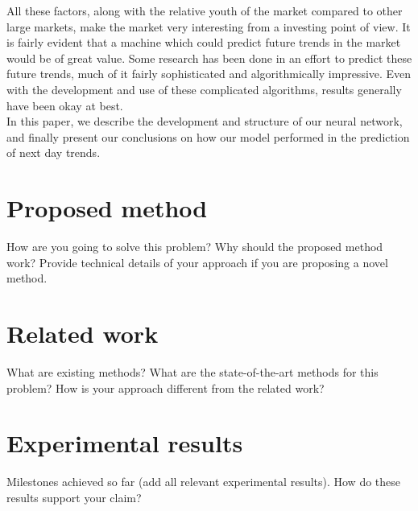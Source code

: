 \documentclass[twoside]{article}
\begin{document}
All these factors, along with the relative youth of the market compared to other large markets, make the market very interesting from a investing point of view. It is fairly evident that a machine which could predict future trends in the market would be of great value. Some research has been done in an effort to predict these future trends, much of it fairly sophisticated and algorithmically impressive. Even with the development and use of these complicated algorithms, results generally have been okay at best.\\

In this paper, we describe the development and structure of our neural network, and finally present our conclusions on how our model performed in the prediction of next day trends.


\section{Proposed method}

How are you going to solve this problem? Why should the proposed method work? Provide technical details of your approach if you are proposing a novel method.\\
\lipsum[4] %


\section{Related work}

What are existing methods? What are the state-of-the-art methods for this problem? How is your approach different from the related work?\\

\lipsum[5] %


\section{Experimental results}

Milestones achieved so far (add all relevant experimental results). How do these results support your claim?\\

\lipsum[5] %


\end{document}
